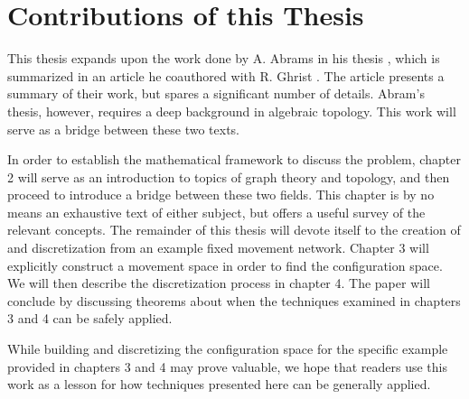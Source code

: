 \section{Contributions of this Thesis}
This thesis expands upon the work done by A. Abrams in his thesis \cite{thesis}, which is summarized in an article he coauthored with R. Ghrist \cite{factory}. The article presents a summary of their work, but spares a significant number of details. Abram's thesis, however, requires a deep background in algebraic topology. This work will serve as a bridge between these two texts.

In order to establish the mathematical framework to discuss the problem, chapter 2 will serve as an introduction to topics of graph theory and topology, and then proceed to introduce a bridge between these two fields. This chapter is by no means an exhaustive text of either subject, but offers a useful survey of the relevant concepts. The remainder of this thesis will devote itself to the creation of and discretization from an example fixed movement network. Chapter 3 will explicitly construct a movement space in order to find the configuration space. We will then describe the discretization process in chapter 4. The paper will conclude by discussing theorems about when the techniques examined in chapters 3 and 4 can be safely applied.

While building and discretizing the configuration space for the specific example provided in chapters 3 and 4 may prove valuable, we hope that readers use this work as a lesson for how techniques presented here can be generally applied.
